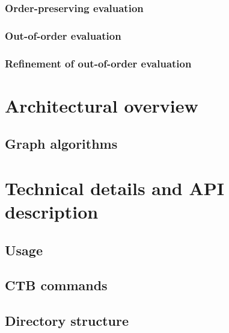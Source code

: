         \subsection{Order-preserving evaluation} 

        \subsection{Out-of-order evaluation} 

        \subsection{Refinement of out-of-order evaluation} 

\chapter{Architectural overview}

    \label{ch:implementation}

   

   

    \pagebreak
    \section{Graph algorithms} 

    


\chapter{Technical details and API description}
    \label{ch:faq}

    \section{Usage} 

    \section{CTB commands} 

    \section{Directory structure} 

